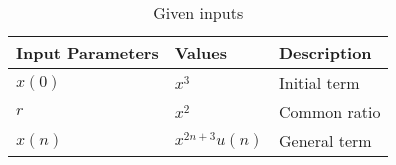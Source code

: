 \begin{table}[htbp]
\centering
\def\arraystrech{1.5}
	\begin{tabular}{|p{2.5cm}|p{1.5cm}|p{3cm}|}
\hline
		\textbf{Input Parameters} & \textbf{Values} & \textbf{Description} \\
\hline
		$x(0)$ & $x^3$ & Initial term\\
\hline
		$r$ & $x^2$ & Common ratio\\
\hline
		$x(n)$ & $x^{2n+3}u(n)$ & General term \\
\hline
\end{tabular}
\caption{Given inputs}
\label{tab:1.11.9.3.Q10}
\end{table}

